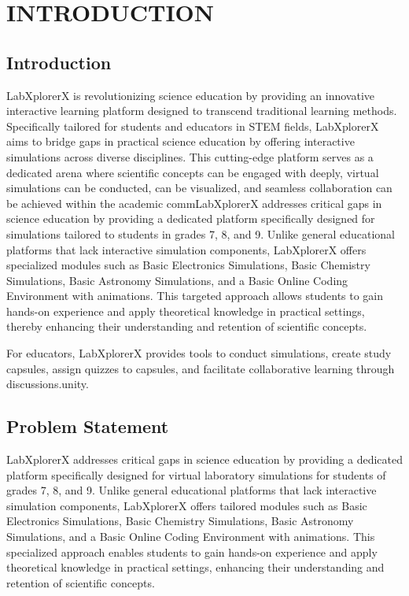 \chapter{INTRODUCTION}



\section{Introduction}
LabXplorerX is revolutionizing science education by providing an innovative interactive learning platform designed to transcend traditional learning methods. Specifically tailored for students and educators in STEM fields, LabXplorerX aims to bridge gaps in practical science education by offering interactive simulations across diverse disciplines. This cutting-edge platform serves as a dedicated arena where scientific concepts can be engaged with deeply, virtual simulations can be conducted, can be visualized, and seamless collaboration can be achieved within the academic commLabXplorerX addresses critical gaps in science education by providing a dedicated platform specifically designed for simulations tailored to students in grades 7, 8, and 9. Unlike general educational platforms that lack interactive simulation components, LabXplorerX offers specialized modules such as Basic Electronics Simulations, Basic Chemistry Simulations, Basic Astronomy Simulations, and a Basic Online Coding Environment with animations. This targeted approach allows students to gain hands-on experience and apply theoretical knowledge in practical settings, thereby enhancing their understanding and retention of scientific concepts.

For educators, LabXplorerX provides tools to conduct simulations, create study capsules, assign quizzes to capsules, and facilitate collaborative learning through discussions.unity.


\section{Problem Statement }
LabXplorerX addresses critical gaps in science education by providing a dedicated platform specifically designed for virtual laboratory simulations for students of grades 7, 8, and 9. Unlike general educational platforms that lack interactive simulation components, LabXplorerX offers tailored modules such as Basic Electronics Simulations, Basic Chemistry Simulations, Basic Astronomy Simulations, and a Basic Online Coding Environment with animations. This specialized approach enables students to gain hands-on experience and apply theoretical knowledge in practical settings, enhancing their understanding and retention of scientific concepts.

